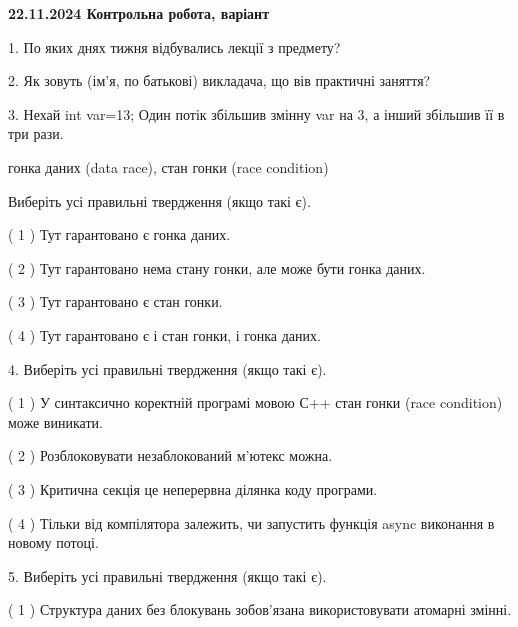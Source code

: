 \documentclass[12pt, ukrainian]{article}
\begin{document}
\vspace{4mm}
\newpage
\begin {large}

\textbf{22.11.2024 Контрольна робота, варіант  }\par


{
1. По яких днях тижня відбувались лекції з предмету?



\vspace{5mm}
2. Як зовуть (ім'я, по батькові) викладача, що вів практичні заняття?



\vspace{5mm}
3. Нехай int var=13; Один потік збільшив змінну var на 3, а інший збільшив її в три рази.

гонка даних (data race), стан гонки (race condition)

Виберіть усі правильні твердження (якщо такі є).\par
\vspace{2mm}
( 1 ) Тут гарантовано є гонка даних.%

( 2 ) Тут гарантовано нема стану гонки, але може бути гонка даних.%

( 3 ) Тут гарантовано є стан гонки.%

( 4 ) Тут гарантовано є і стан гонки, і гонка даних.%


\vspace{5mm}
4. Виберіть усі правильні твердження (якщо такі є).\par
\vspace{2mm}

( 1 ) У синтаксично коректній програмі мовою С++ стан гонки (race condition) може виникати.%

( 2 ) Розблоковувати незаблокований м’ютекс можна.%

( 3 ) Критична секція це неперервна ділянка коду програми.%

( 4 ) Тільки від компілятора залежить, чи запустить функція async виконання в новому потоці.%


\vspace{5mm}
5. Виберіть усі правильні твердження (якщо такі є).\par
\vspace{2mm}

( 1 ) Структура даних без блокувань зобов’язана використовувати атомарні змінні.%

}
\end{large}
\end{document}
